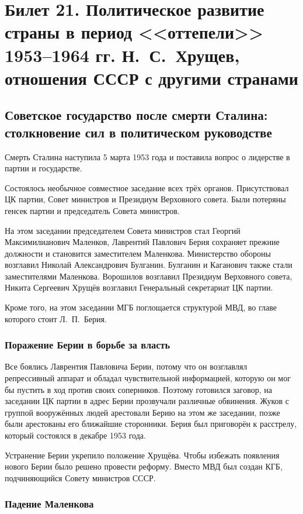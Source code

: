 \section{ Билет 21. Политическое развитие страны в период <<оттепели>> 1953--1964 гг. Н.~С.~Хрущев, отношения СССР с другими странами}

\subsection{Советское государство после смерти Сталина: столкновение сил в политическом руководстве}

Смерть Сталина наступила 5 марта 1953 года и поставила вопрос о лидерстве в партии и государстве.

Состоялось необычное совместное заседание всех трёх органов. Присутствовал ЦК партии, Совет министров и Президиум Верховного совета. Были потеряны генсек партии и председатель Совета министров.

На этом заседании председателем Совета министров стал Георгий Максимилианович Маленков, Лаврентий Павлович Берия сохраняет прежние должности и становится заместителем Маленкова. Министерство обороны возглавил Николай Александрович Булганин. Булганин и Каганович также стали заместителями Маленкова. Ворошилов возглавил Президиум Верховного совета, Никита Сергеевич Хрущёв возглавил Генеральный секретариат ЦК партии.

Кроме того, на этом заседании МГБ поглощается структурой МВД, во главе которого стоит Л.~П.~Берия.

\subsubsection{Поражение Берии в борьбе за власть}

Все боялись Лаврентия Павловича Берии, потому что он возглавлял репрессивный аппарат и обладал чувствительной информацией, которую он мог бы пустить в ход против своих соперников. Поэтому готовился заговор, на заседании ЦК партии в адрес Берии прозвучали различные обвинения. Жуков с группой вооружённых людей арестовали Берию на этом же заседании, позже были арестованы его ближайшие сторонники. Берия был приговорён к расстрелу, который состоялся в декабре 1953 года.

Устранение Берии укрепило положение Хрущёва. Чтобы избежать появления нового Берии было решено провести реформу. Вместо МВД был создан КГБ, подчиняющийся Совету министров СССР.

\subsubsection{Падение Маленкова}

